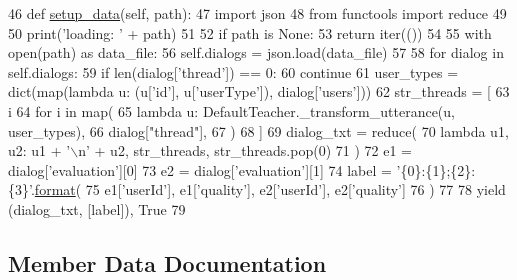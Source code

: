 \begin{DoxyCode}
46     \textcolor{keyword}{def }\hyperlink{namespaceparlai_1_1tasks_1_1multinli_1_1agents_a4fa2cb0ba1ed745336ad8bceed36b841}{setup\_data}(self, path):
47         \textcolor{keyword}{import} json
48         \textcolor{keyword}{from} functools \textcolor{keyword}{import} reduce
49 
50         print(\textcolor{stringliteral}{'loading: '} + path)
51 
52         \textcolor{keywordflow}{if} path \textcolor{keywordflow}{is} \textcolor{keywordtype}{None}:
53             \textcolor{keywordflow}{return} iter(())
54 
55         with open(path) \textcolor{keyword}{as} data\_file:
56             self.dialogs = json.load(data\_file)
57 
58         \textcolor{keywordflow}{for} dialog \textcolor{keywordflow}{in} self.dialogs:
59             \textcolor{keywordflow}{if} len(dialog[\textcolor{stringliteral}{'thread'}]) == 0:
60                 \textcolor{keywordflow}{continue}
61             user\_types = dict(map(\textcolor{keyword}{lambda} u: (u[\textcolor{stringliteral}{'id'}], u[\textcolor{stringliteral}{'userType'}]), dialog[\textcolor{stringliteral}{'users'}]))
62             str\_threads = [
63                 i
64                 \textcolor{keywordflow}{for} i \textcolor{keywordflow}{in} map(
65                     \textcolor{keyword}{lambda} u: DefaultTeacher.\_transform\_utterance(u, user\_types),
66                     dialog[\textcolor{stringliteral}{"thread"}],
67                 )
68             ]
69             dialog\_txt = reduce(
70                 \textcolor{keyword}{lambda} u1, u2: u1 + \textcolor{stringliteral}{'\(\backslash\)n'} + u2, str\_threads, str\_threads.pop(0)
71             )
72             e1 = dialog[\textcolor{stringliteral}{'evaluation'}][0]
73             e2 = dialog[\textcolor{stringliteral}{'evaluation'}][1]
74             label = \textcolor{stringliteral}{'\{0\}:\{1\};\{2\}:\{3\}'}.\hyperlink{namespaceparlai_1_1chat__service_1_1services_1_1messenger_1_1shared__utils_a32e2e2022b824fbaf80c747160b52a76}{format}(
75                 e1[\textcolor{stringliteral}{'userId'}], e1[\textcolor{stringliteral}{'quality'}], e2[\textcolor{stringliteral}{'userId'}], e2[\textcolor{stringliteral}{'quality'}]
76             )
77 
78             \textcolor{keywordflow}{yield} (dialog\_txt, [label]), \textcolor{keyword}{True}
79 \end{DoxyCode}


\subsection{Member Data Documentation}
\mbox{\label{classparlai_1_1tasks_1_1dialogue__qe_1_1agents_1_1DefaultTeacher_a18ebf9bfac4f5585c7413bd566030a0c}} 

